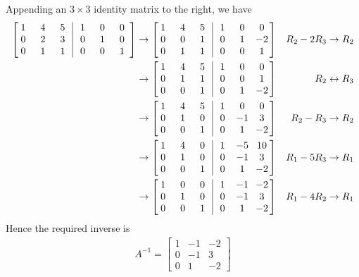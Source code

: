 \begin{solution}
Appending an $3 \times 3$ identity matrix to the right, we have
\begin{align*}
\left[\begin{array}{@{}wc{10pt}wc{10pt}wc{10pt}|wc{10pt}wc{10pt}wc{10pt}@{\;}}
1 & 4 & 5 & 1 & 0 & 0 \\
0 & 2 & 3 & 0 & 1 & 0 \\
0 & 1 & 1 & 0 & 0 & 1
\end{array}\right] 
& \to
\left[\begin{array}{@{}wc{10pt}wc{10pt}wc{10pt}|wc{10pt}wc{10pt}wc{10pt}@{\;}}
1 & 4 & 5 & 1 & 0 & 0 \\
0 & 0 & 1 & 0 & 1 & -2 \\
0 & 1 & 1 & 0 & 0 & 1
\end{array}\right] & R_2 - 2R_3 \to R_2 \\
& \to
\left[\begin{array}{@{}wc{10pt}wc{10pt}wc{10pt}|wc{10pt}wc{10pt}wc{10pt}@{\;}}
1 & 4 & 5 & 1 & 0 & 0 \\
0 & 1 & 1 & 0 & 0 & 1 \\
0 & 0 & 1 & 0 & 1 & -2 
\end{array}\right] & R_2 \leftrightarrow R_3 \\
& \to
\left[\begin{array}{@{}wc{10pt}wc{10pt}wc{10pt}|wc{10pt}wc{10pt}wc{10pt}@{\;}}
1 & 4 & 5 & 1 & 0 & 0 \\
0 & 1 & 0 & 0 & -1 & 3 \\
0 & 0 & 1 & 0 & 1 & -2 
\end{array}\right] & R_2 - R_3 \to R_2 \\
& \to
\left[\begin{array}{@{}wc{10pt}wc{10pt}wc{10pt}|wc{10pt}wc{10pt}wc{10pt}@{\;}}
1 & 4 & 0 & 1 & -5 & 10 \\
0 & 1 & 0 & 0 & -1 & 3 \\
0 & 0 & 1 & 0 & 1 & -2 
\end{array}\right] & R_1 - 5R_3 \to R_1 \\
& \to
\left[\begin{array}{@{}wc{10pt}wc{10pt}wc{10pt}|wc{10pt}wc{10pt}wc{10pt}@{\;}}
1 & 0 & 0 & 1 & -1 & -2 \\
0 & 1 & 0 & 0 & -1 & 3 \\
0 & 0 & 1 & 0 & 1 & -2 
\end{array}\right] & R_1 - 4R_2 \to R_1 
\end{align*}
Hence the required inverse is
\begin{align*}
A^{-1} =
\begin{bmatrix}
1 & -1 & -2 \\
0 & -1 & 3 \\
0 & 1 & -2 
\end{bmatrix}    
\end{align*}
\end{solution}

